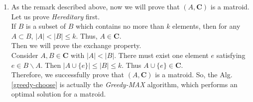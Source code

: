 \documentclass[12pt,a4paper]{article}
\makeatletter
\newtheorem*{solution}{Solution}
\theoremstyle{definition}
\renewenvironment{solution}[1][Solution] {\par\pushQED{\qed}\normalfont\topsep6\p@\@plus6\p@\relax\trivlist\item[\hskip\labelsep\bfseries#1\@addpunct{.}]\ignorespaces}{\popQED\endtrivlist\@endpefalse} \makeatother
\makeatother
\begin{document}
\begin{enumerate}
\begin{enumerate}
\begin{solution}
        As the remark described above, now we will prove that $(A,\mathbf{C})$ is a matroid.\\
        Let us prove \emph{Hereditary} first.\\
        If $B$ is a subset of $B$ which contains no more than $k$ elements, then for any $A\subset B$, $|A|<|B|\leq k$. Thus, $A\in \mathbf{C}$.\\
        Then we will prove the exchange property.\\
        Consider $A,B \in \mathbf{C}$ with $|A|<|B|$. There must exist one element $e$ satisfying $e\in B\backslash A$. Then $|A\cup\{e\}|\leq |B|\leq k$. Thus $A\cup \{e\}\in \mathbf{C}$.\\
        Therefore, we successfully prove that $(A,\mathbf{C})$ is a matroid. So, the Alg.\ref{greedy-choose} is actually the \emph{Greedy-MAX} algorithm, which performs an optimal solution for a matroid.
        
	\end{solution}


\end{enumerate}
\end{enumerate}
\end{document}
